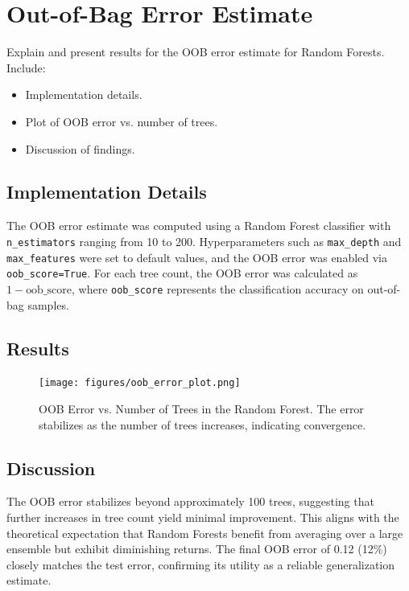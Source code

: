 \documentclass[12pt]{article}
\begin{document}
\newpage
\section{Out-of-Bag Error Estimate}
Explain and present results for the OOB error estimate for Random Forests. Include:
\begin{itemize}
    \item Implementation details.
    \item Plot of OOB error vs. number of trees.
    \item Discussion of findings.
\end{itemize}

\subsection*{Implementation Details}
The OOB error estimate was computed using a Random Forest classifier with \texttt{n\_estimators} ranging from 10 to 200. 
Hyperparameters such as \texttt{max\_depth} and \texttt{max\_features} were set to default values, and the OOB error was 
enabled via \texttt{oob\_score=True}. For each tree count, the OOB error was calculated as \( 1 - \text{oob\_score} \), where 
\texttt{oob\_score} represents the classification accuracy on out-of-bag samples.

\subsection*{Results}
\begin{figure}[h!]
    \centering
    \texttt{[image: figures/oob\_error\_plot.png]}
    \caption{OOB Error vs. Number of Trees in the Random Forest. The error stabilizes as the number of trees increases, indicating convergence.}
    \label{fig:oob_error}
\end{figure}

\subsection*{Discussion}
The OOB error stabilizes beyond approximately 100 trees, suggesting that further increases in tree count yield minimal improvement. This aligns with the theoretical expectation that Random Forests benefit from averaging over a large ensemble but exhibit diminishing returns. The final OOB error of 0.12 (12\%) closely matches the test error, confirming its utility as a reliable generalization estimate.
\end{document}
